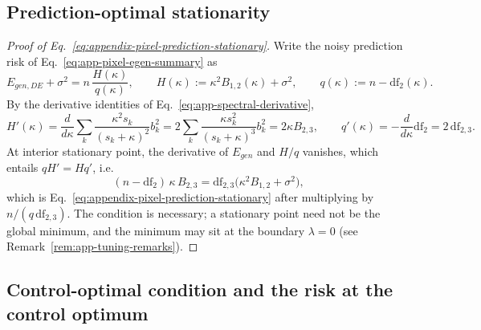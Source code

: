 \subsection{Prediction-optimal stationarity}

\begin{proof}[Proof of Eq.~\ref{eq:appendix-pixel-prediction-stationary}]
Write the noisy prediction risk of Eq.~\ref{eq:app-pixel-egen-summary} as
\[
E_{gen,DE}+\sigma^2=n\,\frac{H(\kappa)}{q(\kappa)},\qquad
H(\kappa):=\kappa^2B_{1,2}(\kappa)+\sigma^2,\qquad
q(\kappa):=n-\mathrm{df}_2(\kappa).
\]
By the derivative identities of Eq.~\ref{eq:app-spectral-derivative},
\[
H'(\kappa)=\frac{d}{d\kappa}\sum_k\frac{\kappa^2s_k}{(s_k+\kappa)^2}b_k^2
=2\sum_k\frac{\kappa s_k^2}{(s_k+\kappa)^3}b_k^2=2\kappa B_{2,3},
\qquad
q'(\kappa)=-\frac{d}{d\kappa}\mathrm{df}_2=2\,\mathrm{df}_{2,3}.
\]
At interior stationary point, the derivative of $E_{gen}$ and $H/q$ vanishes, which entails $qH'=Hq'$, i.e.
\begin{equation}
(n-\mathrm{df}_2)\,\kappa\,B_{2,3}=\mathrm{df}_{2,3}\big(\kappa^2B_{1,2}+\sigma^2\big),
\label{eq:optimal_CV_E_gen_condition_abbrev}
\end{equation}
which is Eq.~\ref{eq:appendix-pixel-prediction-stationary} after
multiplying by $n/(q\,\mathrm{df}_{2,3})$.  The condition is necessary; a
stationary point need not be the global minimum, and the minimum may sit at
the boundary $\lambda=0$ (see Remark~\ref{rem:app-tuning-remarks}).
\end{proof}

\subsection{Control-optimal condition and the risk at the control optimum}

